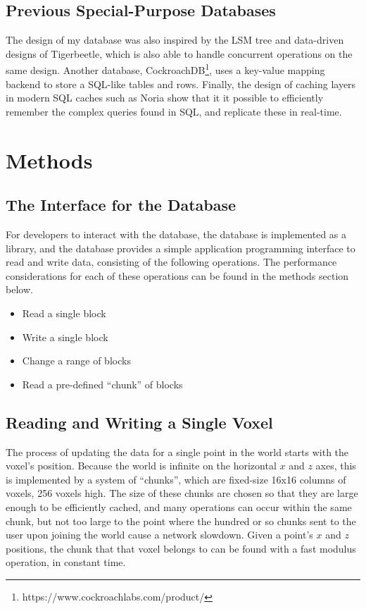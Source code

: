 \documentclass[10pt,twocolumn]{article}
\begin{document}
\subsection{Previous Special-Purpose Databases}

The design of my database was also inspired by the LSM tree and data-driven
designs of Tigerbeetle\cite{tigerbeetleDesign}, which is also able to handle
concurrent operations on the same design. Another database,
CockroachDB\footnote{https://www.cockroachlabs.com/product/}, uses a key-value
mapping backend to store a SQL-like tables and rows. Finally, the design of
caching layers in modern SQL caches such as Noria\cite{gjengset2018noria} show
that it it possible to efficiently remember the complex queries found in SQL,
and replicate these in real-time.

\section{Methods}

\subsection{The Interface for the Database}

For developers to interact with the database, the database is implemented as a
library, and the database provides a simple application programming interface to
read and write data, consisting of the following operations. The performance
considerations for each of these operations can be found in the methods section
below.

\begin{itemize}
  \item Read a single block
  \item Write a single block
  \item Change a range of blocks
  \item Read a pre-defined ``chunk'' of blocks
\end{itemize}

\subsection{Reading and Writing a Single Voxel}

The process of updating the data for a single point in the world starts with the
voxel's position. Because the world is infinite on the horizontal $x$ and $z$
axes, this is implemented by a system of ``chunks'', which are fixed-size 16x16
columns of voxels, 256 voxels high. The size of these chunks are chosen so that
they are large enough to be efficiently cached, and many operations can occur
within the same chunk, but not too large to the point where the hundred or so
chunks sent to the user upon joining the world cause a network slowdown. Given a
point's $x$ and $z$ positions, the chunk that that voxel belongs to can be found
with a fast modulus operation, in constant time.
\end{document}
